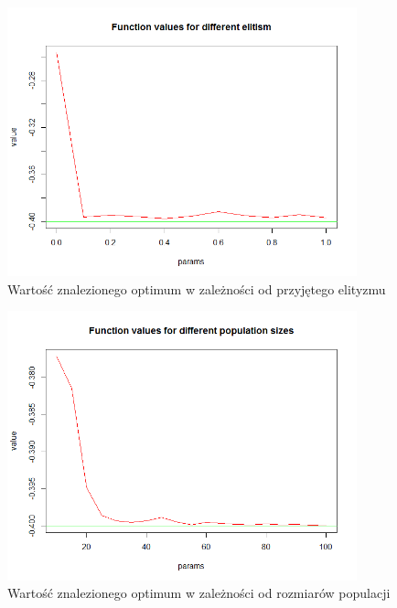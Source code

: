\documentclass[11pt, a4paper]{article}
\begin{document}
\begin{figure}[H]
	\begin{center}
		\includegraphics[width=0.9\textwidth]{./assets/CosMix44.png} %
		\caption{Wartość znalezionego optimum w zależności od przyjętego elityzmu}
		\label{fig:gulf7}
	\end{center}
\end{figure}
\begin{figure}[H]
	\begin{center}
		\includegraphics[width=0.9\textwidth]{./assets/CosMix45.png} %
		\caption{Wartość znalezionego optimum w zależności od rozmiarów populacji}
		\label{fig:gulf7}
	\end{center}
\end{figure}
\end{document}

